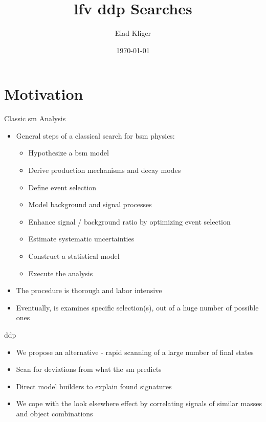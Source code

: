 \documentclass[notheorems]{beamer}
\title{\gls{lfv} \gls{ddp} Searches}
\author{Elad Kliger}
\institute{WIS}
\date{\today}
\begin{document}
\begin{frame}
    \titlepage
\end{frame}

\section{Motivation}

\begin{frame}{Classic \gls{sm} Analysis}
    \begin{itemize}
        \item General steps of a classical search for \gls{bsm} physics:
        \begin{itemize}
            \item Hypothesize a \gls{bsm} model
            \item Derive production mechanisms and decay modes
            \item Define event selection
            \item Model background and signal processes
            \item Enhance signal / background ratio by optimizing event selection
            \item Estimate systematic uncertainties
            \item Construct a statistical model
            \item Execute the analysis
        \end{itemize}
        \item The procedure is thorough and labor intensive
        \item Eventually, is examines specific selection(s), out of a huge number of possible ones
    \end{itemize}
\end{frame}

\begin{frame}{\gls{ddp}}
    \begin{itemize}
        \item We propose an alternative - rapid scanning of a large number of final states
        \item Scan for deviations from what the \gls{sm} predicts
        \item Direct model builders to explain found signatures
        \item We cope with the look elsewhere effect by correlating signals of similar masses and object combinations
    \end{itemize}
\end{frame}
\end{document}

